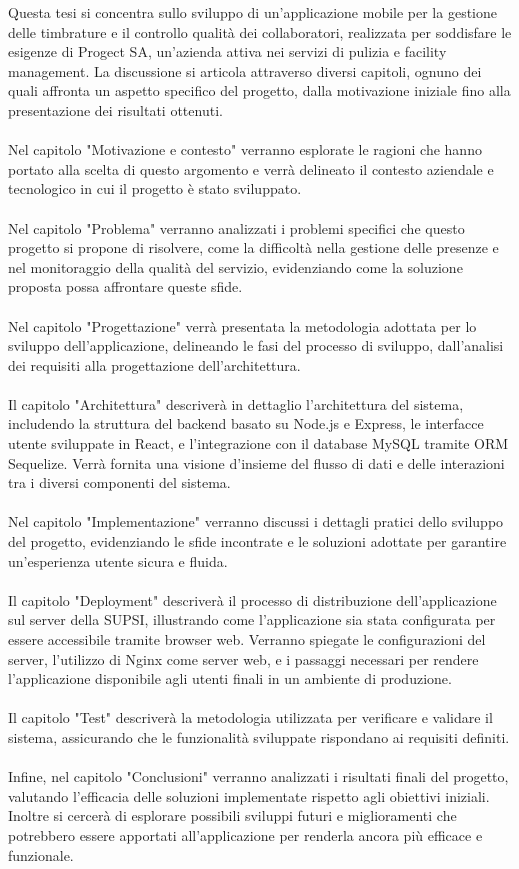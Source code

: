 \documentclass[twoside]{supsistudent}
\begin{document}
Questa tesi si concentra sullo sviluppo di un'applicazione mobile per la gestione delle timbrature e il controllo qualità dei collaboratori, realizzata per soddisfare le esigenze di Progect SA, un'azienda attiva nei servizi di pulizia e facility management. La discussione si articola attraverso diversi capitoli, ognuno dei quali affronta un aspetto specifico del progetto, dalla motivazione iniziale fino alla presentazione dei risultati ottenuti.
\\\\
Nel capitolo "Motivazione e contesto" verranno esplorate le ragioni che hanno portato alla scelta di questo argomento e verrà delineato il contesto aziendale e tecnologico in cui il progetto è stato sviluppato.
\\\\
Nel capitolo "Problema" verranno analizzati i problemi specifici che questo progetto si propone di risolvere, come la difficoltà nella gestione delle presenze e nel monitoraggio della qualità del servizio, evidenziando come la soluzione proposta possa affrontare queste sfide.
\\\\
Nel capitolo "Progettazione" verrà presentata la metodologia adottata per lo sviluppo dell'applicazione, delineando le fasi del processo di sviluppo, dall'analisi dei requisiti alla progettazione dell'architettura.
\\\\
Il capitolo "Architettura" descriverà in dettaglio l'architettura del sistema, includendo la struttura del backend basato su Node.js e Express, le interfacce utente sviluppate in React, e l'integrazione con il database MySQL tramite ORM Sequelize. Verrà fornita una visione d'insieme del flusso di dati e delle interazioni tra i diversi componenti del sistema.
\\\\
Nel capitolo "Implementazione" verranno discussi i dettagli pratici dello sviluppo del progetto, evidenziando le sfide incontrate e le soluzioni adottate per garantire un'esperienza utente sicura e fluida.
\\\\
Il capitolo "Deployment" descriverà il processo di distribuzione dell'applicazione sul server della SUPSI, illustrando come l'applicazione sia stata configurata per essere accessibile tramite browser web. Verranno spiegate le configurazioni del server, l'utilizzo di Nginx come server web, e i passaggi necessari per rendere l'applicazione disponibile agli utenti finali in un ambiente di produzione.
\\\\
Il capitolo "Test" descriverà la metodologia utilizzata per verificare e validare il sistema, assicurando che le funzionalità sviluppate rispondano ai requisiti definiti.
\\\\
Infine, nel capitolo "Conclusioni" verranno analizzati i risultati finali del progetto, valutando l'efficacia delle soluzioni implementate rispetto agli obiettivi iniziali. Inoltre si cercerà di esplorare possibili sviluppi futuri e miglioramenti che potrebbero essere apportati all'applicazione per renderla ancora più efficace e funzionale.
\end{document}
